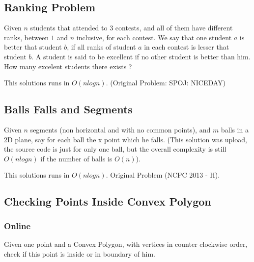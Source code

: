        \subsection{Ranking Problem}
        Given $n$ students that attended to $3$ contests, and all of them have different ranks, between $1$ and $n$ inclusive, for each contest. We say that one student $a$ is better that student $b$, if all ranks of student $a$ in each contest is lesser that student $b$. A student is said to be excellent if no other student is better than him. How many excelent students there exists ?
        
        This solutions runs in $O(nlogn)$. (Original Problem: SPOJ: NICEDAY)
        
        
        \newpage
        \subsection{Balls Falls and Segments}
        Given $n$ segments (non horizontal and with no common points), and $m$ balls in a 2D plane, say for each ball the x point which he falls. (This solution was upload, the source code is just for only one ball, but the overall complexity is still $O(nlogn)$ if the number of balls is $O(n)$).
        
        This solutions runs in $O(nlogn)$. Original Problem (NCPC 2013 - H).
        
        
        \newpage
        \subsection{Checking Points Inside Convex Polygon}
            
            
            \subsubsection{Online}
            Given one point and a Convex Polygon, with vertices in counter clockwise order, check if this point is inside or in boundary of him.
            
